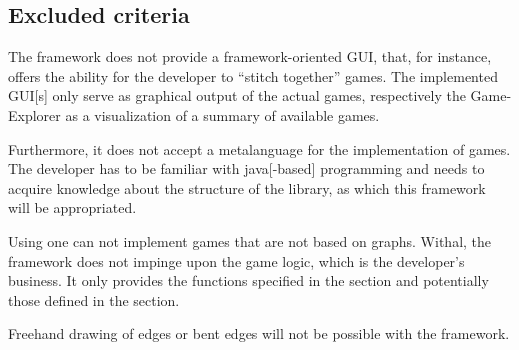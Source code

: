 \subsection{Excluded criteria}
The {\graphioli} framework does not provide a framework-oriented \gls{GUI}, that, for instance, offers the ability for the developer to ``stitch together'' games. The implemented \gls{GUI}[s] only serve as graphical output of the actual games, respectively the Game-Explorer as a visualization of a summary of available games.\par
Furthermore, it does not accept a \gls{metalanguage} for the implementation of games. The \gls{developer} has to be familiar with \Gls{java}[-based] programming and needs to acquire knowledge about the structure of the \gls{library}, as which this framework will be appropriated.\par
Using {\graphioli} one can not implement \glspl{game} that are not based on \glspl{graph}. Withal, the framework does not impinge upon the game logic, which is the developer's business. It only provides the functions specified in the  section and potentially those defined in the  section.\par
Freehand drawing of \glspl{edge} or bent edges will not be possible with the {\graphioli} framework.\par